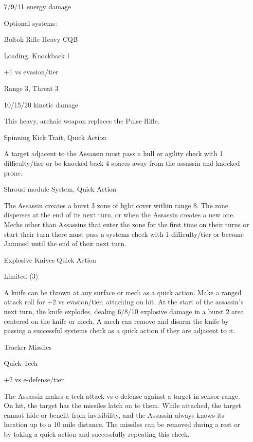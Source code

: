 7/9/11 energy damage
 

                                                                                                               


Optional systems:
 
Boltok Rifle  
Heavy CQB
 
Loading, Knockback 1
 
+1 vs evasion/tier
 
Range 3, Threat 3
 
10/15/20 kinetic damage
 
This heavy, archaic weapon replaces the Pulse Rifle.
 

Spinning Kick  
Trait, Quick Action
 
A target adjacent to the Assassin must pass a hull or agility check with 1 difficulty/tier or be  
knocked back 4 spaces away from the assassin and knocked prone.
 

Shroud module  
System, Quick Action
 
The Assassin creates a burst 3 zone of light cover within range 8. The zone disperses at the end  
of its next turn, or when the Assassin creates a new one. Mechs other than Assassins that enter  
the zone for the first time on their turns or start their turn there must pass a systems check with 1  
difficulty/tier or become Jammed until the end of their next turn.
 

Explosive Knives  
Quick Action
 
Limited (3)
 
A knife can be thrown at any surface or mech as a quick action. Make a ranged attack roll for +2  
vs evasion/tier, attaching on hit. At the start of the assassin’s next turn, the knife explodes,  
dealing 6/8/10 explosive damage in a burst 2 area centered on the knife or mech. A mech can  
remove and disarm the knife by passing a successful systems check as a quick action if they are  
adjacent to it.
 

Tracker Missiles
 
Quick Tech
 
+2 vs e-defense/tier
 
The Assassin makes a tech attack vs e-defense against a target in sensor range. On hit, the  
target has the missiles latch on to them. While attached, the target cannot hide or benefit from  
invisibility, and the Assassin always knows its location up to a 10 mile distance. The missiles can  
be removed during a rest or by taking a quick action and successfully repeating this check.
 

